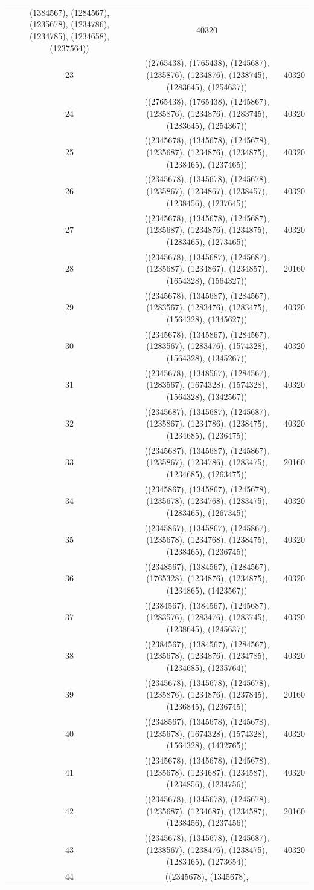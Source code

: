 \documentclass[pdftex]{sigma}
\theoremstyle{definition}
\numberwithin{equation}{section}
\begin{document}
\begin{center}
\begin{longtable}{|@{\,}c@{\,}|@{\,}c@{\,}|@{\,}c@{\,}|}
(1384567), (1284567), (1235678), (1234786), (1234785), (1234658), (1237564)) & 40320 \\ 23 & ((2765438), (1765438), (1245687), (1235876), (1234876), (1238745), (1283645), (1254637)) & 40320 \\ 24 & ((2765438), (1765438), (1245867), (1235876), (1234876), (1283745), (1283645), (1254367)) & 40320 \\ 25 & ((2345678), (1345678), (1245678), (1235687), (1234876), (1234875), (1238465), (1237465)) & 40320 \\ 26 & ((2345678), (1345678), (1245678), (1235867), (1234867), (1238457), (1238456), (1237645)) & 40320 \\ 27 & ((2345678), (1345678), (1245687), (1235687), (1234876), (1234875), (1283465), (1273465)) & 40320 \\ 28 & ((2345678), (1345687), (1245687), (1235687), (1234867), (1234857), (1654328), (1564327)) & 20160 \\ 29 & ((2345678), (1345687), (1284567), (1283567), (1283476), (1283475), (1564328), (1345627)) & 40320 \\ 30 & ((2345678), (1345867), (1284567), (1283567), (1283476), (1574328), (1564328), (1345267)) & 40320 \\ 31 & ((2345678), (1348567), (1284567), (1283567), (1674328), (1574328), (1564328), (1342567)) & 40320 \\ 32 & ((2345687), (1345687), (1245687), (1235867), (1234786), (1238475), (1234685), (1236475)) & 40320 \\ 33 & ((2345687), (1345687), (1245867), (1235867), (1234786), (1283475), (1234685), (1263475)) & 20160 \\ 34 & ((2345867), (1345867), (1245678), (1235678), (1234768), (1283475), (1283465), (1267345)) & 40320 \\ 35 & ((2345867), (1345867), (1245867), (1235678), (1234768), (1238475), (1238465), (1236745)) & 40320 \\ 36 & ((2348567), (1384567), (1284567), (1765328), (1234876), (1234875), (1234865), (1423567)) & 40320 \\ 37 & ((2384567), (1384567), (1245687), (1283576), (1283476), (1283745), (1238645), (1245637)) & 40320 \\ 38 & ((2384567), (1384567), (1284567), (1235678), (1234876), (1234785), (1234685), (1235764)) & 40320 \\ 39 & ((2345678), (1345678), (1245678), (1235876), (1234876), (1237845), (1236845), (1236745)) & 20160 \\ 40 & ((2348567), (1345678), (1245678), (1235678), (1674328), (1574328), (1564328), (1432765)) & 40320 \\ 41 & ((2345678), (1345678), (1245678), (1235678), (1234687), (1234587), (1234856), (1234756)) & 40320 \\ 42 & ((2345678), (1345678), (1245678), (1235687), (1234687), (1234587), (1238456), (1237456)) & 20160 \\ 43 & ((2345678), (1345678), (1245687), (1238567), (1238476), (1238475), (1283465), (1273654)) & 40320 \\ 44 & ((2345678), (1345678), 
\end{longtable}
\end{center}
\end{document}
